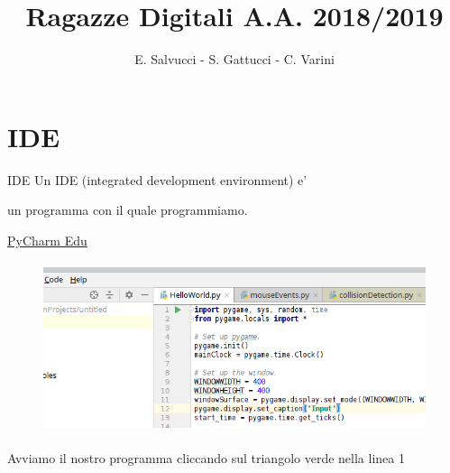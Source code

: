 \documentclass{beamer}
\title[Ragazze Digitali 2019]{Ragazze Digitali A.A. 2018/2019}
\author{E. Salvucci - S. Gattucci - C. Varini}
\date{}
\begin{document}



\section{IDE}

\begin{frame}{IDE}
Un IDE (integrated development environment) e'

un programma con il quale programmiamo.

\vspace{3.0mm}
\begin{center}
    \href{https://www.jetbrains.com/pycharm-edu/download}{PyCharm Edu}
\end{center}
        
\begin{figure}
    \includegraphics[height=5cm]{images/esempio_pycharm_editor.png}
\end{figure}

Avviamo il nostro programma cliccando sul triangolo verde nella linea 1
\end{frame}
\end{document}
